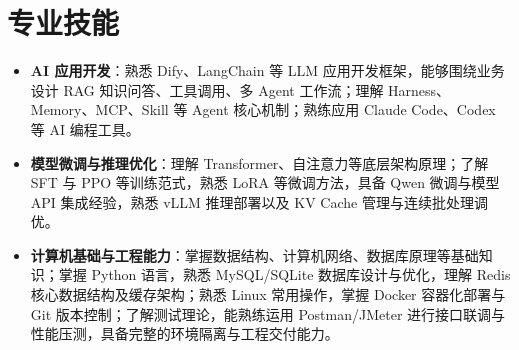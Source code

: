 \documentclass[10pt]{article}
\begin{document}
    \ResumeContactBar
    \ResumeProfileAndEducation


    \section[专业技能]{\makebox[\iconwidth][c]{\color{primarycolor}{\faWrench}}\quad 专业技能}
    \begin{itemize}
        \item \textbf{AI 应用开发}：熟悉 Dify、LangChain 等 LLM 应用开发框架，能够围绕业务设计 RAG 知识问答、工具调用、多 Agent 工作流；理解 Harness、Memory、MCP、Skill 等 Agent 核心机制；熟练应用 Claude Code、Codex 等 AI 编程工具。
        \item \textbf{模型微调与推理优化}：理解 Transformer、自注意力等底层架构原理；了解 SFT 与 PPO 等训练范式，熟悉 LoRA 等微调方法，具备 Qwen 微调与模型 API 集成经验，熟悉 vLLM 推理部署以及 KV Cache 管理与连续批处理调优。
        \item \textbf{计算机基础与工程能力}：掌握数据结构、计算机网络、数据库原理等基础知识；掌握 Python 语言，熟悉 MySQL/SQLite 数据库设计与优化，理解 Redis 核心数据结构及缓存架构；熟悉 Linux 常用操作，掌握 Docker 容器化部署与 Git 版本控制；了解测试理论，能熟练运用 Postman/JMeter 进行接口联调与性能压测，具备完整的环境隔离与工程交付能力。
    \end{itemize}

\end{document}
